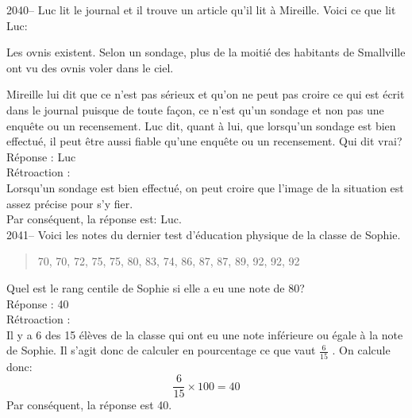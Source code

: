 \documentclass[letterpaper, 12pt]{article}
\begin{document}

2040-- Luc lit le journal et il trouve un article qu'il lit \`a Mireille. Voici ce que lit Luc:
\begin{center}
 \og Les ovnis existent. Selon un sondage, plus de la moiti\'e des habitants de Smallville ont vu des ovnis voler dans le ciel. \fg
\end{center}
Mireille lui dit que ce n'est pas s\'erieux et qu'on ne peut pas croire ce qui est \'ecrit dans le journal puisque de toute fa\c con, ce n'est qu'un sondage et non pas une enqu\^ete ou un recensement. Luc dit, quant \`a lui, que lorsqu'un sondage est bien effectu\'e, il peut \^etre aussi fiable qu'une enqu\^ete ou un recensement. Qui dit vrai?\\

R\'eponse : Luc\\

R\'etroaction :\\
Lorsqu'un sondage est bien effectu\'e, on peut croire que l'image de la situation est assez pr\'ecise pour s'y fier. \\
Par cons\'equent, la r\'eponse est: Luc.\\

2041-- Voici les notes du dernier test d'\'education physique de la
classe de Sophie.
\begin{quote}
 70, 70, 72, 75, 75, 80, 83, 74, 86, 87, 87, 89, 92, 92, 92
\end{quote}
Quel est le rang centile de Sophie si elle a eu une note de 80? \\

R\'eponse : 40\\

R\'etroaction :\\
Il y a 6 des 15 \'el\`eves de la classe qui ont eu une note inf\'erieure ou \'egale \`a la note de Sophie. Il s'agit donc de calculer en pourcentage ce que vaut $\frac{6}{15}$ . On calcule donc:  \\
\begin{equation*}
 \frac{6}{15} \times 100 = 40
\end{equation*}
Par cons\'equent, la r\'eponse est 40.\\

\end{document}
